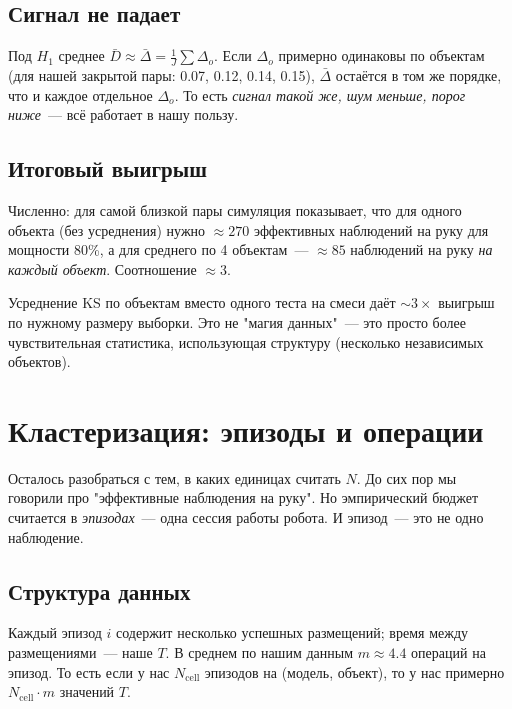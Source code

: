 \documentclass[11pt]{article}
\begin{document}
\subsection{Сигнал не падает}

Под $H_1$ среднее $\bar D \approx \bar\Delta = \frac{1}{J}\sum \Delta_o$. Если $\Delta_o$ примерно одинаковы по объектам (для нашей закрытой пары: 0.07, 0.12, 0.14, 0.15), $\bar\Delta$ остаётся в том же порядке, что и каждое отдельное $\Delta_o$. То есть \emph{сигнал такой же, шум меньше, порог ниже}~--- всё работает в нашу пользу.

\subsection{Итоговый выигрыш}

Численно: для самой близкой пары симуляция показывает, что для одного объекта (без усреднения) нужно $\approx 270$ эффективных наблюдений на руку для мощности 80\%, а для среднего по 4 объектам~--- $\approx 85$ наблюдений на руку \emph{на каждый объект}. Соотношение $\approx 3$.

\begin{tldr}
Усреднение KS по объектам вместо одного теста на смеси даёт $\sim 3\times$ выигрыш по нужному размеру выборки. Это не "магия данных"~--- это просто более чувствительная статистика, использующая структуру (несколько независимых объектов).
\end{tldr}

\section{Кластеризация: эпизоды и операции}

Осталось разобраться с тем, в каких единицах считать $N$. До сих пор мы говорили про "эффективные наблюдения на руку". Но эмпирический бюджет считается в \emph{эпизодах}~--- одна сессия работы робота. И эпизод~--- это не одно наблюдение.

\subsection{Структура данных}

Каждый эпизод $i$ содержит несколько успешных размещений; время между размещениями~--- наше $T$. В среднем по нашим данным $m \approx 4.4$ операций на эпизод. То есть если у нас $N_\text{cell}$ эпизодов на (модель, объект), то у нас примерно $N_\text{cell} \cdot m$ значений $T$.
\end{document}
